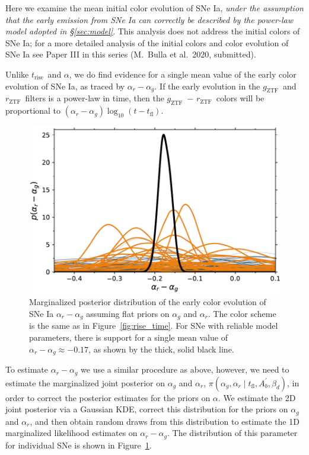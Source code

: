 \documentclass[twocolumn]{./aastex63}
\newcommand{\rztf}{$r_\mathrm{ZTF}$}
\newcommand{\gztf}{$g_\mathrm{ZTF}$}
\newcommand{\trise}{$t_\mathrm{rise}$}
\begin{document}
Here we examine the mean initial color evolution of SNe Ia, \textit{under the
assumption that the early emission from SNe Ia can correctly be described by
the power-law model adopted in \S\ref{sec:model}}. This analysis does not
address the initial colors of SNe Ia; for a more detailed analysis of the
initial colors and color evolution of SNe Ia see Paper III in this series
(M.~Bulla et al.~2020, submitted).

Unlike \trise\ and $\alpha$, we do find evidence for a single mean value of
the early color evolution of SNe Ia, as traced by $\alpha_r - \alpha_g$. If
the early evolution in the \gztf\ and \rztf\ filters is a power-law in time,
then the \gztf\ $-$ \rztf\ colors will be proportional to $(\alpha_r -
\alpha_g) \log_{10} (t - t_\mathrm{fl})$.

\begin{figure}
    \centering
    \includegraphics[width=1\linewidth]{./figures/delta.pdf}
    \caption{Marginalized posterior distribution of the early color evolution
    of SNe Ia $\alpha_r - \alpha_g$ assuming flat priors on $\alpha_g$ and
    $\alpha_r$. The color scheme is the same as in Figure~\ref{fig:rise_time}.
    For SNe with reliable model parameters, there is support for a single mean
    value of $\alpha_r - \alpha_g \approx -0.17$, as shown by the thick, solid
    black line.}
    \label{fig:delta}
\end{figure}

To estimate $\alpha_r - \alpha_g$ we use a similar procedure as above,
however, we need to estimate the marginalized joint posterior on $\alpha_g$
and $\alpha_r$, $\pi(\alpha_g,\alpha_r \mid t_\mathrm{fl}, A^\prime_b,
\beta_d)$, in order to correct the posterior estimates for the priors on
$\alpha$. We estimate the 2D joint posterior via a Gaussian KDE,
correct this distribution for the priors on $\alpha_g$ and $\alpha_r$, and
then obtain random draws from this distribution to estimate the 1D
marginalized likelihood estimates on $\alpha_r - \alpha_g$. The distribution
of this parameter for individual SNe is shown in Figure~\ref{fig:delta}.
\end{document}
